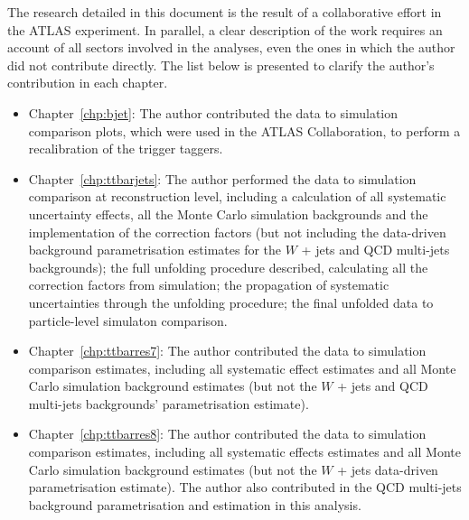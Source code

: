 
The research detailed in this document is the result of a collaborative effort in the ATLAS experiment.
In parallel, a clear description of the work requires an account of all sectors involved in the analyses,
even the ones in which the author did not contribute directly.
The list below is presented to clarify the author's contribution in each chapter.

\begin{itemize}
  \item Chapter~\ref{chp:bjet}: The author contributed the data to simulation comparison plots, which were used in the ATLAS Collaboration, to perform a recalibration of the \bjet trigger taggers.
  \item Chapter~\ref{chp:ttbarjets}: The author performed the data to simulation comparison at reconstruction level, including a calculation of all systematic uncertainty effects, all the Monte Carlo simulation backgrounds and the implementation of the correction factors (but not including the data-driven background parametrisation estimates for the $W$ + jets and QCD multi-jets backgrounds); the full unfolding procedure described, calculating all the correction factors from simulation; the propagation of systematic uncertainties through the unfolding procedure; the final unfolded data to particle-level simulaton comparison.
  \item Chapter~\ref{chp:ttbarres7}: The author contributed the data to simulation comparison estimates, including all systematic effect estimates and all Monte Carlo simulation background estimates (but not the $W$ + jets and QCD multi-jets backgrounds' parametrisation estimate).
  \item Chapter~\ref{chp:ttbarres8}: The author contributed the data to simulation comparison estimates, including all systematic effects estimates and all Monte Carlo simulation background estimates (but not the $W$ + jets data-driven parametrisation estimate). The author also contributed in the QCD multi-jets background parametrisation and estimation in this analysis.
\end{itemize}

